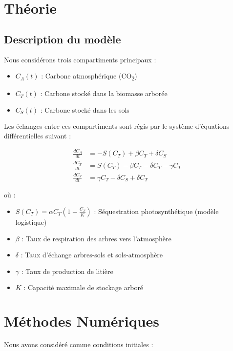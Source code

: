 \documentclass[12pt]{article}
\theoremstyle{saav}
\newcommand{\bk}{\bigskip}
\begin{document}
	\section{Théorie}
	\subsection{Description du modèle}
	Nous considérons trois compartiments principaux :
	\begin{itemize}
		\item $C_A(t)$ : Carbone atmosphérique (CO\textsubscript{2})
		\item $C_T(t)$ : Carbone stocké dans la biomasse arborée
		\item $C_S(t)$ : Carbone stocké dans les sols
	\end{itemize}
	
	Les échanges entre ces compartiments sont régis par le système d'équations différentielles suivant :
	
	\begin{align}
		\frac{dC_A}{dt} &= -S(C_T) + \beta C_T + \delta C_S \label{eq:ca} \\
		\frac{dC_T}{dt} &= S(C_T) - \beta C_T - \delta C_T - \gamma C_T \label{eq:ct} \\
		\frac{dC_S}{dt} &= \gamma C_T - \delta C_S + \delta C_T \label{eq:cs}
	\end{align}
	
	où :
	\begin{itemize}
		\item $S(C_T) = \alpha C_T (1 - \frac{C_T}{K})$ : Séquestration photosynthétique (modèle logistique)
		\item $\beta$ : Taux de respiration des arbres vers l'atmosphère
		\item $\delta$ : Taux d'échange arbres-sols et sols-atmosphère
		\item $\gamma$ : Taux de production de litière
		\item $K$ : Capacité maximale de stockage arboré
	\end{itemize}
	
	\section{Méthodes Numériques}
	Nous avons considéré comme conditions initiales :

	\bk
	
\end{document}
